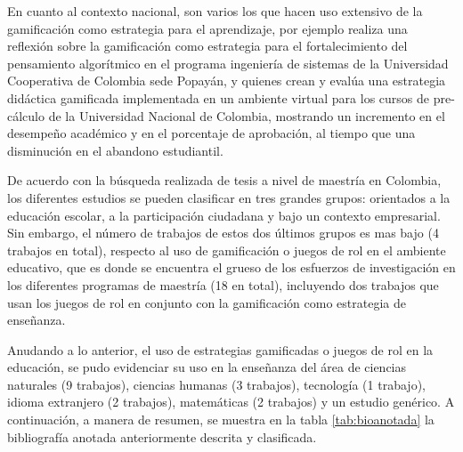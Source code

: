 En cuanto al contexto nacional, son varios los que hacen uso extensivo de la gamificación como estrategia para
el aprendizaje, por ejemplo  realiza una reflexión sobre la gamificación como estrategia 
para el fortalecimiento del pensamiento algorítmico en el programa ingeniería de sistemas de la Universidad 
Cooperativa de Colombia sede Popayán, y  quienes crean y evalúa una estrategia didáctica 
gamificada implementada en un ambiente virtual para los cursos de pre-cálculo de la Universidad Nacional de 
Colombia, mostrando un incremento en el desempeño académico y en el porcentaje de aprobación, al tiempo que
una disminución en el abandono estudiantil.

De acuerdo con la búsqueda realizada de tesis a nivel de maestría en Colombia, los diferentes estudios se 
pueden clasificar en tres grandes grupos: orientados a la educación escolar, a la participación ciudadana y 
bajo un contexto empresarial. Sin embargo, el número de trabajos de estos dos últimos grupos es mas bajo (4 
trabajos en total), respecto al uso de gamificación o juegos de rol en el ambiente educativo, que es donde se 
encuentra el grueso de los esfuerzos de investigación en los diferentes programas de maestría (18 en total), 
incluyendo dos trabajos que usan los juegos de rol en conjunto con la gamificación como estrategia de 
enseñanza.

Anudando a lo anterior, el uso de estrategias gamificadas o juegos de rol en la educación, se pudo evidenciar
su uso en la enseñanza del área de ciencias naturales (9 trabajos), ciencias humanas (3 trabajos), tecnología 
(1 trabajo), idioma extranjero (2 trabajos), matemáticas (2 trabajos) y un estudio genérico. A continuación, a 
manera de resumen, se muestra en la tabla \ref{tab:bioanotada} la bibliografía anotada anteriormente descrita 
y clasificada.

